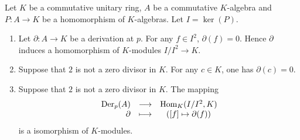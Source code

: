 \begin{propositionenv}
    Let $K$ be a commutative unitary ring, $A$ be a commutative $K$-algebra and $P : A \rightarrow K$ be a homomorphism of $K$-algebras.
    Let $I = \ker(P)$.
    \begin{enumerate}[label=(\arabic*)]
        \item Let $\partial : A \rightarrow K$ be a derivation at $p$.
            For any $f \in I^2$, $\partial(f) = 0$.
            Hence $\partial$ induces a homomorphism of $K$-modules $I/I^2 \rightarrow K$.
        \item  Suppose that $2$ is not a zero divisor in $K$.
            For any $c \in K$, one has $\partial(c) = 0$.
        \item Suppose that $2$ is not a zero divisor in $K$.
            The mapping 
            $$\begin{array}{rrcl}
                \operatorname{\mathrm{Der}}_p(A) & \longrightarrow & \operatorname{\mathrm{Hom}}_K(I/I^2, K)\\
                \partial & \longmapsto & ([f] \mapsto \partial(f))
            \end{array}$$
            is a isomorphism of $K$-modules.
    \end{enumerate}
\end{propositionenv}
